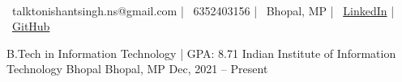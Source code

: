 \documentclass[]{awesome-cv}
\begin{document}
\begin{center}
      \\
    \vspace{2mm}
    {\faEnvelope\ talktonishantsingh.ns@gmail.com} | {\faMobile\ 6352403156} | {\faMapMarker\ Bhopal, MP} | {\faLink\ \href{https://www.linkedin.com/in/tesla59/}{LinkedIn}} | {\faLink\ \href{https://www.github.com/tesla59/}{GitHub}}
\end{center}

\begin{cventries}
    \cventry
    {B.Tech in Information Technology | GPA: 8.71 }
    {Indian Institute of Information Technology Bhopal}
    {Bhopal, MP}
    {Dec, 2021 – Present}
    {}
\end{cventries}
\vspace{-6mm}
\end{document}
